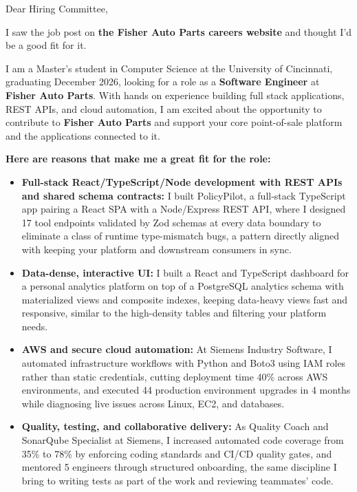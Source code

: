 \documentclass[11pt]{letter}
\date{}
\begin{document}
\begin{letter}{}

\opening{Dear Hiring Committee,}

I saw the job post on \textbf{the Fisher Auto Parts careers website} and thought I'd be a good fit for it.

I am a Master's student in Computer Science at the University of Cincinnati, graduating December 2026, looking for a role as a \textbf{Software Engineer} at \textbf{Fisher Auto Parts}. With hands on experience building full stack applications, REST APIs, and cloud automation, I am excited about the opportunity to contribute to \textbf{Fisher Auto Parts} and support your core point-of-sale platform and the applications connected to it.

\textbf{Here are reasons that make me a great fit for the role:}

\begin{itemize}[leftmargin=*, itemsep=0.45em]
    \item \textbf{Full-stack React/TypeScript/Node development with REST APIs and shared schema contracts:} I built PolicyPilot, a full-stack TypeScript app pairing a React SPA with a Node/Express REST API, where I designed 17 tool endpoints validated by Zod schemas at every data boundary to eliminate a class of runtime type-mismatch bugs, a pattern directly aligned with keeping your platform and downstream consumers in sync.

    \item \textbf{Data-dense, interactive UI:} I built a React and TypeScript dashboard for a personal analytics platform on top of a PostgreSQL analytics schema with materialized views and composite indexes, keeping data-heavy views fast and responsive, similar to the high-density tables and filtering your platform needs.

    \item \textbf{AWS and secure cloud automation:} At Siemens Industry Software, I automated infrastructure workflows with Python and Boto3 using IAM roles rather than static credentials, cutting deployment time 40\% across AWS environments, and executed 44 production environment upgrades in 4 months while diagnosing live issues across Linux, EC2, and databases.

    \item \textbf{Quality, testing, and collaborative delivery:} As Quality Coach and SonarQube Specialist at Siemens, I increased automated code coverage from 35\% to 78\% by enforcing coding standards and CI/CD quality gates, and mentored 5 engineers through structured onboarding, the same discipline I bring to writing tests as part of the work and reviewing teammates' code.


\end{itemize}
\end{letter}
\end{document}
